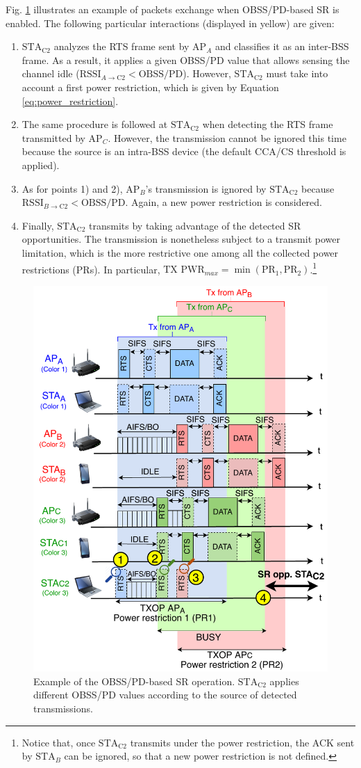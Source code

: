 \documentclass{article}
\begin{document}
Fig. \ref{fig:fig_12} illustrates an example of packets exchange when OBSS/PD-based SR is enabled. The following particular interactions (displayed in yellow) are given:
\begin{enumerate}
	\item $\text{STA}_\text{C2}$ analyzes the RTS frame sent by $\text{AP}_A$ and classifies it as an inter-BSS frame. As a result, it applies a given OBSS/PD value that allows sensing the channel idle ($\text{RSSI}_{A \rightarrow \text{C2}} < \text{OBSS/PD}$). However, $\text{STA}_\text{C2}$ must take into account a first power restriction, which is given by Equation \eqref{eq:power_restriction}.
	\item The same procedure is followed at $\text{STA}_\text{C2}$ when detecting the RTS frame transmitted by $\text{AP}_C$. However, the transmission cannot be ignored this time because the source is an intra-BSS device (the default CCA/CS threshold is applied).
	\item As for points 1) and 2), $\text{AP}_B$'s transmission is ignored by $\text{STA}_\text{C2}$ because $\text{RSSI}_{B \rightarrow \text{C2}} < \text{OBSS/PD}$. Again, a new power restriction is considered.
	\item Finally, $\text{STA}_\text{C2}$ transmits by taking advantage of the detected SR opportunities. The transmission is nonetheless subject to a transmit power limitation, which is the more restrictive one among all the collected power restrictions (PRs). In particular, $\text{TX PWR}_{max} = \min(\text{PR}_1, \text{PR}_2)$.\footnote{Notice that, once $\text{STA}_\text{C2}$ transmits under the power restriction, the ACK sent by $\text{STA}_B$ can be ignored, so that a new power restriction is not defined.}
\end{enumerate}

\begin{figure}[ht!]
	\centering
	\includegraphics[width=.6\columnwidth]{fig_12}
	\caption{Example of the OBSS/PD-based SR operation. $\text{STA}_\text{C2}$ applies different OBSS/PD values according to the source of detected transmissions.}
	\label{fig:fig_12}
\end{figure}
\end{document}
